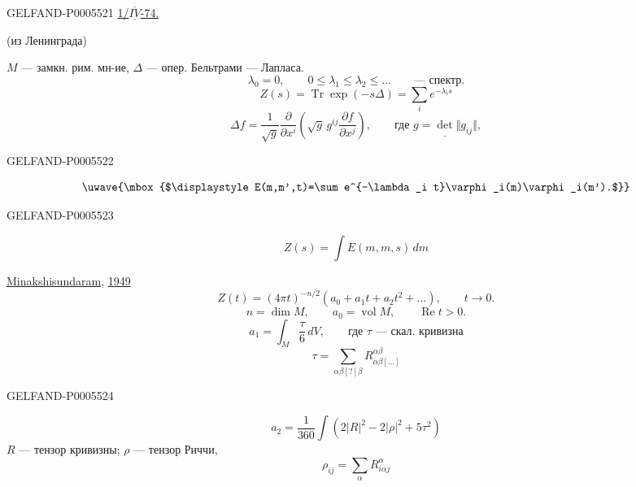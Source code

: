 \begin{GelfandAdjacentEvidence}{GELFAND-P000552}{1}
\uline{1/\mbox{$\overline{\underline{IV}}$}-74.}\qquad
{}

\qquad{}

\hspace{2em}(из Ленинграда)\par
\(M\) — замкн. рим. мн-ие, \(\Delta\) — опер. Бельтрами — Лапласа.
\[
\lambda_0=0,\qquad 0\le\lambda_1\le\lambda_2\le\ldots
\qquad\text{— спектр.}
\]
\[
Z(s)=\operatorname{Tr}\exp(-s\Delta)=\sum_i e^{-\lambda_i s}
\]
\[
\Delta f=\frac{1}{\sqrt g}\frac{\partial}{\partial x^i}
\left(\sqrt g\, g^{ij}\frac{\partial f}{\partial x^j}\right),
\qquad\text{где }\underline{g=\det\Vert g_{ij}\Vert},
\]
\end{GelfandAdjacentEvidence}
\begin{GelfandAdjacentEvidence}{GELFAND-P000552}{2}

\[
\uwave{\mbox{$\displaystyle E(m,m',t)=\sum e^{-\lambda_i t}\varphi_i(m)\varphi_i(m').$}}
\]
\end{GelfandAdjacentEvidence}
\begin{GelfandAdjacentEvidence}{GELFAND-P000552}{3}

\[
Z(s)=\int E(m,m,s)\,dm
\]

\uline{Minakshisundaram}, \uline{1949}
\[
Z(t)=(4\pi t)^{-n/2}(a_0+a_1t+a_2t^2+\ldots),
\qquad t\to0.
\]
\[
n=\dim M,\qquad a_0=\operatorname{vol} M,\qquad \operatorname{Re}t>0.
\]
\[
a_1=\int_M \frac{\tau}{6}\,dV,
\qquad\text{где }\tau\text{ — скал. кривизна}
\]
\[
\tau=\sum_{\alpha\beta[?]\beta}R_{\alpha\beta[\ldots]}^{\alpha\beta}
\]
\end{GelfandAdjacentEvidence}
\begin{GelfandAdjacentEvidence}{GELFAND-P000552}{4}

\[
a_2=\frac1{360}\int\left(2|R|^2-2|\rho|^2+5\tau^2\right)
\]
\(R\) — тензор кривизны; \(\rho\) — тензор Риччи,
\[
\rho_{ij}=\sum_\alpha R_{i\alpha j}^{\alpha}
\]
\end{GelfandAdjacentEvidence}

